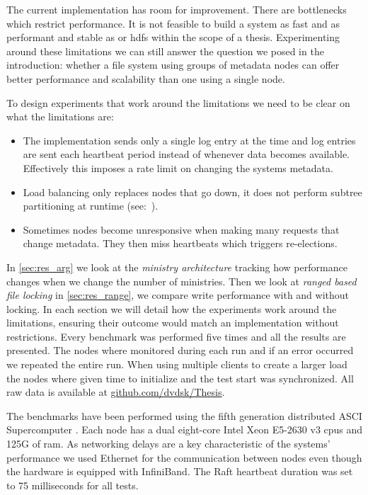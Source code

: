 The current implementation has room for improvement. There are bottlenecks which restrict performance. It is not feasible to build a system as fast and as performant and stable as \ceph{} or \ac{hdfs} within the scope of a thesis. Experimenting around these limitations we can still answer the question we posed in the introduction: whether a file system using groups of metadata nodes can offer better performance and scalability than one using a single node.

To design experiments that work around the limitations we need to be clear on what the limitations are:

\begin{itemize}
	\item The \raft{} implementation sends only a single log entry at the time and log entries are sent each heartbeat period instead of whenever data becomes available. Effectively this imposes a rate limit on changing the systems metadata.
	\item Load balancing only replaces nodes that go down, it does not perform subtree partitioning at runtime (see:~).
	\item Sometimes nodes become unresponsive when making many requests that change metadata. They then miss heartbeats which triggers re-elections.
\end{itemize}

In \cref{sec:res_arg} we look at the \textit{ministry architecture} tracking how performance changes when we change the number of ministries. Then we look at \textit{ranged based file locking} in \cref{sec:res_range}, we compare write performance with and without locking. In each section we will detail how the experiments work around the limitations, ensuring their outcome would match an implementation without restrictions. Every benchmark was performed five times and all the results are presented. The nodes where monitored during each run and if an error occurred we repeated the entire run. When using multiple clients to create a larger load the nodes where given time to initialize and the test start was synchronized. All raw data is available at \href{https://github.com/dvdsk/Thesis}{github.com/dvdsk/Thesis}.

The benchmarks have been performed using the fifth generation distributed ASCI Supercomputer \cite{das5}. Each node has a dual eight-core Intel Xeon E5-2630 v3 cpus and 125G of ram. As networking delays are a key characteristic of the systems' performance we used Ethernet for the communication between nodes even though the hardware is equipped with InfiniBand. The Raft heartbeat duration was set to 75 milliseconds for all tests.


